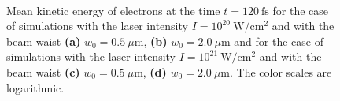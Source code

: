 \begin{figure}[h!]
	\centering
	\\[2mm]
	\caption{Mean kinetic energy of electrons at the time $ t = 120 \ \mathrm{fs} $ for the case of simulations with the laser intensity $ I = 10^{20} \ \mathrm{W/cm^2} $ and with the beam waist \textbf{(a)} $ w_0 = 0.5 \ \mu\mathrm{m} $, \textbf{(b)} $ w_0 = 2.0 \ \mu\mathrm{m} $ and for the case of simulations with the laser intensity $ I = 10^{21} \ \mathrm{W/cm^2} $ and with the beam waist \textbf{(c)} $ w_0 = 0.5 \ \mu\mathrm{m} $, \textbf{(d)} $ w_0 = 2.0 \ \mu\mathrm{m} $. The color scales are logarithmic.}
	\label{fig:16}
\end{figure}

